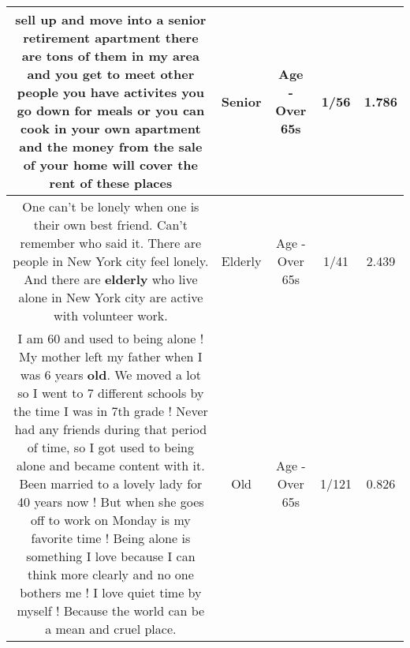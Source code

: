 \documentclass[11pt]{article}
\newlength\mylength
\begin{document}
\begin{center}
\begin{longtable}{|C{.65\mylength}|C{.30\mylength}|C{.12\mylength}|C{.12\mylength}|C{.12\mylength}|}
  \small sell up and move into a \textbf{senior}  retirement apartment there are tons of them in my area  and you get to meet other people you have activites  you go down for meals or you can cook in your own apartment and the money from the sale of your home will cover the rent of these places\normalsize   & Senior & Age - Over 65s & 1/56 & 1.786 \\  \hline
  \small One can't be lonely when one is their own best friend.  Can't remember who said it. There are people in New York city feel lonely. And there are \textbf{elderly} who live alone in New York city are active with volunteer work.\normalsize   & Elderly & Age - Over 65s & 1/41 & 2.439 \\  \hline
  \small I am 60 and used to being alone !  My mother left my father when I was 6 years \textbf{old}.   We moved a lot so I went to 7 different schools by the time I was in 7th grade !  Never had any friends during that period of time,  so I got used to being alone and became content with it.   Been married to a lovely lady for 40 years now !  But when she goes off to work on Monday is my favorite time !  Being alone is something I love because I can think more clearly and no one bothers me !  I love quiet time by myself !   Because the world can be a mean and cruel place.\normalsize   & Old & Age - Over 65s & 1/121 & 0.826 \\  \hline

\end{longtable}
\end{center}
\end{document}
